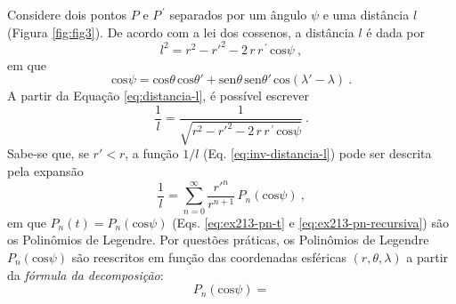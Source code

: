 \documentclass[10pt,a4paper,fleqn]{article}
\begin{document}
Considere dois pontos $P$ e $P^{\,\prime}$ separados por um ângulo $\psi$ e
uma distância $l$ (Figura \ref{fig:fig3}). De acordo com a lei dos cossenos,
a distância $l$ é dada por
\begin{equation}
l^{2} = r^{2} - r'^{2} - 2 \, r \, r^{\,\prime} \, \text{cos}\psi \: ,
\label{eq:distancia-l}
\end{equation}
em que
\begin{equation}
\text{cos}\psi = \text{cos}\theta \, \text{cos}\theta' + 
                 \text{sen}\theta \, \text{sen}\theta' \, \text{cos}(\lambda' - \lambda) \: .
\label{eq:cos-psi}
\end{equation}
A partir da Equa\c{c}ão \ref{eq:distancia-l}, é possível escrever
\begin{equation}
\dfrac{1}{l} = \dfrac{1}{\sqrt{r^{2} - r'^{2} - 2 \, r \, r^{\,\prime} \, \text{cos}\psi}} \: .
\label{eq:inv-distancia-l}
\end{equation}
Sabe-se que, se $r' < r$, a fun\c{c}ão $1/l$ (Eq. \ref{eq:inv-distancia-l}) pode
ser descrita pela expansão
\begin{equation}
\dfrac{1}{l} = \sum_{n=0}^{\infty} \dfrac{r'^{n}}{r^{n+1}} \, P_{n}(\text{cos}\psi) \: ,
\label{eq:inv-distancia-l-Pn}
\end{equation}
em que $P_{n}(t) = P_{n}(\text{cos}\psi)$ (Eqs. \ref{eq:ex213-pn-t} e \ref{eq:ex213-pn-recursiva})
são os Polinômios de Legendre. Por questões práticas, os Polinômios de Legendre 
$P_{n}(\text{cos}\psi)$ são reescritos em fun\c{c}ão das coordenadas esféricas 
$(r, \theta, \lambda)$ a partir da \textit{fórmula da decomposi\c{c}ão}:
\begin{equation}
P_{n}(\text{cos}\psi) = 
\label{eq:formula-decomposicao}
\end{equation}
\end{document}

